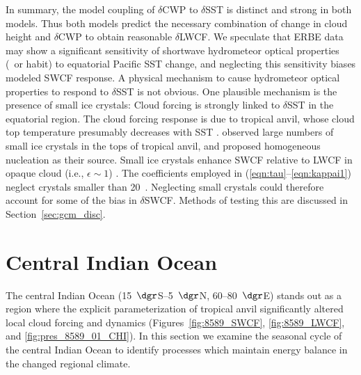 \documentclass[agums]{aguplus}
\begin{document}
In summary, the model coupling of $\delta$CWP to $\delta$SST is
distinct and strong in both models.
Thus both models predict the necessary combination of change in cloud
height and $\delta$CWP to obtain reasonable $\delta$LWCF.   
We speculate that ERBE data may show a significant sensitivity of
shortwave hydrometeor optical properties (\rdsffc\ or habit) to equatorial
Pacific SST change, and neglecting this sensitivity biases modeled
SWCF response.  
A physical mechanism to cause hydrometeor optical properties to
respond to $\delta$SST is not obvious.
One plausible mechanism is the presence of small ice crystals: 
Cloud forcing is strongly linked to $\delta$SST in the equatorial
region. 
The cloud forcing response is due to tropical anvil, whose cloud top
temperature presumably decreases with SST \cite[e.g.,][]{RaC91}.  
\cite{KKW93} observed large numbers of small ice crystals in the tops 
of tropical anvil, and proposed homogeneous nucleation as their
source. 
Small ice crystals enhance SWCF relative to LWCF in opaque cloud 
(i.e., $\epsilon \sim 1$) \cite[]{ZeK94}.
The coefficients employed in (\ref{eqn:tau}--\ref{eqn:kappai1})
neglect crystals smaller than 20~\um.
Neglecting small crystals could therefore account for some of the bias
in $\delta$SWCF. 
Methods of testing this are discussed in Section~\ref{sec:gcm_disc}.


\section{Central Indian Ocean}\label{sec:reg}

The central Indian Ocean (15~$\dgr$S--5~$\dgr$N,
60--80~$\dgr$E)  
stands out as a region where the explicit parameterization of
tropical anvil significantly altered local cloud forcing and
dynamics (Figures~\ref{fig:8589_SWCF}, \ref{fig:8589_LWCF}, and 
\ref{fig:pres_8589_01_CHI}). 
In this section we examine the seasonal cycle of the central Indian
Ocean to identify processes which maintain energy balance in the
changed regional climate.
\end{document}

